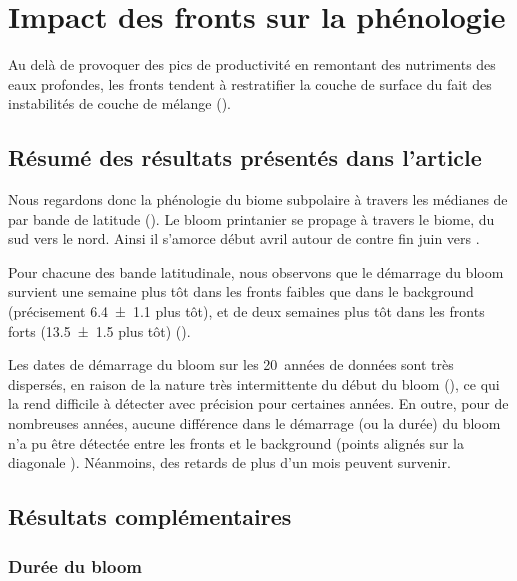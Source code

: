 
\chapter{Impact des fronts sur la phénologie}
\addChpLof
\label{chp:res-phenologie}
\graphicspath{{resources/res_phénologie}}

{
  \hypersetup{hidelinks}
  \minitoc%
  \clearpage
}

Au delà de provoquer des pics de productivité en remontant des nutriments des eaux profondes, les fronts tendent à restratifier la couche de surface du fait des instabilités de couche de mélange ().

\section{Résumé des résultats présentés dans l'article}
\label{sec:resume-res-phenologie}

Nous regardons donc la phénologie du biome subpolaire à travers les médianes de  par bande de latitude ().
Le bloom printanier se propage à travers le biome, du sud vers le nord.
Ainsi il s'amorce début avril autour de  contre fin juin vers .

Pour chacune des bande latitudinale, nous observons que le démarrage du bloom survient une semaine plus tôt dans les fronts faibles que dans le background (précisement \qty{6.4 \pm 1.1}{\jours} plus tôt), et de deux semaines plus tôt dans les fronts forts (\qty{13.5 \pm 1.5}{\jours} plus tôt) ().

Les dates de démarrage du bloom sur les 20~années de données sont très dispersés, en raison de la nature très intermittente du début du bloom (\cite{keerthi_2021}), ce qui la rend difficile à détecter avec précision pour certaines années.
En outre, pour de nombreuses années, aucune différence dans le démarrage (ou la durée) du bloom n'a pu être détectée entre les fronts et le background (points alignés sur la diagonale ).
Néanmoins, des retards de plus d'un mois peuvent survenir.

\section{Résultats complémentaires}
\label{sec:complements-phenologie}

\subsection{Durée du bloom}
\label{sec:duree-bloom}

